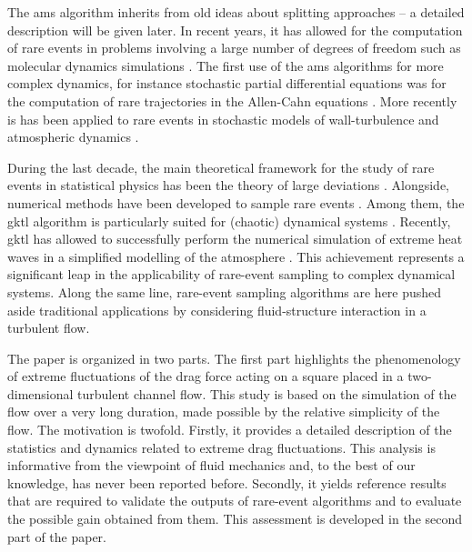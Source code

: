 \documentclass[pre,aps,floatfix,10pt,superscriptaddress, notitlepage,preprint]{revtex4-1}
\begin{document}
The \acl{ams} algorithm \cite{cerou_adaptive_2007} inherits from old ideas about splitting approaches \cite{KahnHarris1951,glasserman_look_1998,glasserman_multilevel_1999} -- a detailed description will be given later.  
In recent years, it has allowed for the computation of rare events in problems involving a large number of degrees of freedom such as molecular dynamics simulations \cite{aristoff_adaptive_2015,teo_adaptive_2016}. The first use of the \ac{ams} algorithms for more complex dynamics, for instance stochastic partial differential equations was for the computation of rare trajectories in the Allen-Cahn equations \cite{rolland_computing_2016}. More recently is has been applied to rare events in stochastic models of wall-turbulence \cite{rolland_extremely_2018} and atmospheric dynamics \cite{bouchet2019rare}.

During the last decade, the main theoretical framework for the study of rare events in statistical physics has been the theory of large deviations \cite{touchette_large_2009}.
Alongside, numerical methods have been developed to sample rare events \cite{moral_feynman-kac_2004}. 
Among them, the \ac{gktl} algorithm \cite{giardina_direct_2006} is particularly suited for (chaotic) dynamical systems \cite{giardina_simulating_2011,Laffargue_2013}.
%
{Recently, \ac{gktl} has allowed to successfully perform the numerical simulation of extreme heat waves in a simplified modelling of the atmosphere \cite{ragone_computation_2018}. 
This achievement represents a significant leap in the applicability of rare-event sampling to complex dynamical systems. Along the same line, rare-event sampling algorithms are here pushed aside traditional applications by considering fluid-structure interaction in a turbulent flow.}
%

{The paper is organized in two parts. The first part highlights the phenomenology of extreme fluctuations of the drag force acting on a square placed in a two-dimensional turbulent channel flow. This study is based on the simulation of the flow over a very long duration, made possible by the relative simplicity of the flow.}
%
The motivation is twofold.
Firstly, it provides a detailed description of the statistics and dynamics related to extreme drag fluctuations. This analysis is informative from the  viewpoint of fluid mechanics and, to the best of our knowledge, has never been reported before.
Secondly, it yields reference results that are required to validate the outputs of rare-event algorithms and to evaluate the possible gain obtained from them. This assessment is developed in the second part of the paper.
\end{document}
